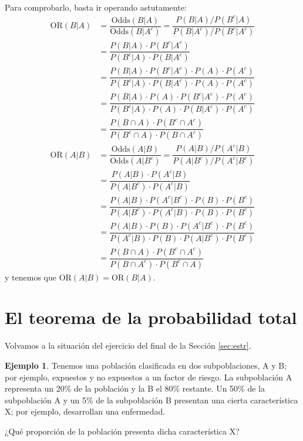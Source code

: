 \documentclass[
]{book}
\theoremstyle{definition}
\theoremstyle{definition}
\newtheorem{example}{Ejemplo}[chapter]
\theoremstyle{definition}
\theoremstyle{definition}
\theoremstyle{remark}
\begin{document}
\begin{rmdcorbes}
Para comprobarlo, basta ir operando astutamente:
\[
\begin{array}{l}
\text{OR}(B|A)\!\!\!\!\! &= \dfrac{\text{Odds}(B|A)}{\text{Odds}(B|A^c)}  = \dfrac{P(B|A)/P(B^c|A)}{P(B|A^c)/P(B^c|A^c)}\\
&=\dfrac{P(B|A)\cdot P(B^c|A^c)}{P(B^c|A)\cdot P(B|A^c)}\\
& =\dfrac{P(B|A)\cdot P(B^c|A^c)\cdot P(A)\cdot P(A^c)}{P(B^c|A)\cdot P(B|A^c)\cdot P(A)\cdot P(A^c)}\\
& =\dfrac{P(B|A)\cdot P(A)\cdot P(B^c|A^c)\cdot P(A^c)}{P(B^c|A)\cdot P(A)\cdot P(B|A^c)\cdot P(A^c)}\\
& =\dfrac{P(B\cap A)\cdot P(B^c\cap A^c)}{P(B^c\cap A)\cdot P(B\cap A^c)}\\
\text{OR}(A|B) & = \dfrac{\text{Odds}(A|B)}{\text{Odds}(A|B^c)} =\dfrac{P(A|B)/P(A^c|B)}{P(A|B^c)/P(A^c|B^c)}\\
& =\dfrac{P(A|B)\cdot P(A^c|B)}{P(A|B^c)\cdot P(A^c|B)}\\
& =\dfrac{P(A|B)\cdot P(A^c|B^c)\cdot P(B)\cdot P(B^c)}{P(A|B^c)\cdot P(A^c|B)\cdot P(B)\cdot P(B^c)}\\
& =\dfrac{P(A|B)\cdot P(B)\cdot P(A^c|B^c)\cdot P(B^c)}{P(A^c|B)\cdot P(B)\cdot P(A|B^c)\cdot P(B^c)}\\
& =\dfrac{P(B\cap A)\cdot P(B^c\cap A^c)}{P(B\cap A^c)\cdot P(B^c\cap A)}
\end{array}
\]
y tenemos que \(\text{OR}(A|B)=\text{OR}(B|A)\).
\end{rmdcorbes}

\hypertarget{el-teorema-de-la-probabilidad-total}{%
\section{El teorema de la probabilidad total}\label{el-teorema-de-la-probabilidad-total}}

Volvamos a la situación del ejercicio del final de la Sección \ref{sec:estr}.

\begin{example}
\protect\hypertarget{exm:TPT1}{}\label{exm:TPT1}Tenemos una población clasificada en dos subpoblaciones, A y B; por ejemplo, expuestos y no expuestos a un factor de riesgo. La subpoblación A representa un 20\% de la población y la B el 80\% restante. Un 50\% de la subpoblación A y un 5\% de la subpoblación B presentan una cierta característica X; por ejemplo, desarrollan una enfermedad.

¿Qué proporción de la población presenta dicha característica X?
\end{example}
\end{document}
